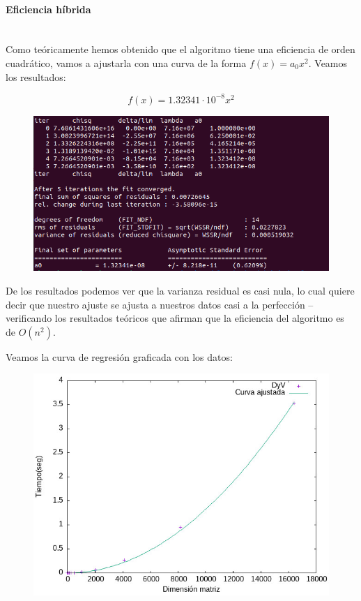 \documentclass{article}
\newcommand{\myparagraph}[1]{\paragraph{#1}\mbox{}\\}
\begin{document}
\myparagraph{Eficiencia híbrida}

    Como teóricamente hemos obtenido que el algoritmo tiene una eficiencia de orden cuadrático, vamos a ajustarla con una curva de la forma $f(x) = a_0 x^{2}$. Veamos los resultados:

    \[
        f(x) = 1.32341\cdot10^{-8} x^{2}
    \]

    \begin{figure}[H]
        \centering
        \includegraphics[scale=0.3]{P2/regresion_solo_DyV.png} 
    \end{figure}

    De los resultados podemos ver que la varianza residual es casi nula, lo cual quiere decir que nuestro ajuste se ajusta a nuestros datos casi a la perfección -- verificando los resultados teóricos que afirman que la eficiencia del algoritmo es de $O(n^{2})$. 

    Veamos la curva de regresión graficada con los datos:
    
    \begin{figure}[H]
        \centering
        \includegraphics[scale = 0.5]{P2/Salida_ajustada1.jpeg}
    \end{figure}
\end{document}
